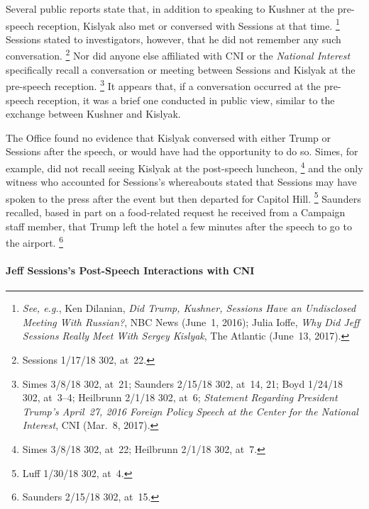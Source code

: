 Several public reports state that, in addition to speaking to Kushner at the pre-speech reception, Kislyak also met or conversed with Sessions at that time.%
\footnote{\textit{See, e.g.}, Ken Dilanian, \textit{Did Trump, Kushner, Sessions Have an Undisclosed Meeting With Russian?}, NBC News (June~1, 2016);
Julia Ioffe, \textit{Why Did Jeff Sessions Really Meet With Sergey Kislyak}, The Atlantic (June~13, 2017).}
Sessions stated to investigators, however, that he did not remember any such conversation.%
\footnote{Sessions 1/17/18 302, at~22.}
Nor did anyone else affiliated with CNI or the \textit{National Interest} specifically recall a conversation or meeting between Sessions and Kislyak at the pre-speech reception.%
\footnote{Simes 3/8/18 302, at~21;
Saunders 2/15/18 302, at~14, 21;
Boyd 1/24/18 302, at~3--4;
Heilbrunn 2/1/18 302, at~6;
\textit{Statement Regarding President Trump's April~27, 2016 Foreign Policy Speech at the Center for the National Interest}, CNI (Mar.~8, 2017).}
It appears that, if a conversation occurred at the pre-speech reception, it was a brief one conducted in public view, similar to the exchange between Kushner and Kislyak.

The Office found no evidence that Kislyak conversed with either Trump or Sessions after the speech, or would have had the opportunity to do so.
Simes, for example, did not recall seeing Kislyak at the post-speech luncheon,%
\footnote{Simes 3/8/18 302, at~22;
Heilbrunn 2/1/18 302, at~7.}
and the only witness who accounted for Sessions's whereabouts stated that Sessions may have spoken to the press after the event but then departed for Capitol Hill.%
\footnote{Luff 1/30/18 302, at~4.}
Saunders recalled, based in part on a food-related request he received from a Campaign staff member, that Trump left the hotel a few minutes after the speech to go to the airport.%
\footnote{Saunders 2/15/18 302, at~15.}

\paragraph{Jeff Sessions's Post-Speech Interactions with CNI}

